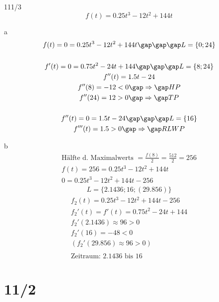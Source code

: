 \begin{exercise}{111/3}
  $$f(t) = 0.25t^3 - 12t^2 + 144t$$
  \item [a]
  \begin{gather*}
    f(t) = 0 = 0.25t^3 - 12t^2 + 144t \gap\gap\gap L = \{0; 24\} \\\\
    f'(t) = 0 = 0.75t^2 - 24t + 144 \gap\gap\gap L = \{8; 24\} \\
    f''(t) = 1.5t - 24 \\
    f''(8) = -12 < 0 \gap\Rightarrow\gap HP \\
    f''(24) = 12 > 0 \gap\Rightarrow\gap TP \\\\
    f''(t) = 0 = 1.5t - 24 \gap\gap\gap L = \{16\} \\
    f'''(t) = 1.5 > 0 \gap\Rightarrow\gap RLWP
  \end{gather*}
  \item [b]
  \begin{gather*}
    \text{Hälfte d. Maximalwerts } = \frac{f(8)}{2} = \frac{512}{2} = 256 \\
    f(t) = 256 = 0.25t^3 - 12t^2 + 144t \\
    0 = 0.25t^3 - 12t^2 + 144t - 256
  \end{gather*}
  \begin{gather*}
    L = \{2.1436; 16; (29.856)\}
  \end{gather*}
  \begin{gather*}
    f_2(t) = 0.25t^3 - 12t^2 + 144t - 256 \\
    f_2'(t) = f'(t) = 0.75t^2 - 24t + 144 \\
    f_2'(2.1436) \approx 96 > 0 \\
    f_2'(16) = -48 < 0 \\
    (f_2'(29.856) \approx 96 > 0) \\\\
    \text{Zeitraum: } 2.1436 \text{ bis } 16
  \end{gather*}
\end{exercise}

\part{11/2}

